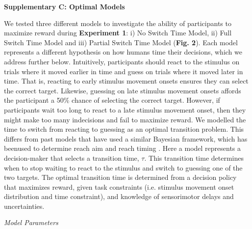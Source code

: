 \documentclass[12pt]{article}
\newcommand\boldblue[1]{\textcolor{mydarkblue}{\textbf{#1}}}
\begin{document}
\newpage
\noindent\boldblue{\large{Supplementary C: Optimal Models}}
\vspace{-1mm}

\noindent We tested three different models to investigate the ability of participants to maximize reward during \boldblue{Experiment 1}: i) No Switch Time Model, ii) Full Switch Time Model and iii) Partial Switch Time Model (\boldblue{Fig. 2}). Each model represents a different hypothesis on how humans time their decisions, which we address further below. Intuitively, participants should react to the stimulus on trials where it moved earlier in time and guess on trials where it moved later in time. That is, reacting to early stimulus movement onsets ensures they can select the correct target. Likewise, guessing on late stimulus movement onsets affords the participant a 50\% chance of selecting the correct target. However, if participants wait too long to react to a late stimulus movement onset, then they might make too many indecisions and fail to maximize reward.
We modelled the time to switch from reacting to guessing as an optimal transition problem. This differs from past models that have used a similar Bayesian framework, which has beenused to determine reach aim \autocite{trommershauserStatisticalDecisionTheory2003} and reach timing \autocite{hudsonOptimalCompensationTemporal2008}. Here a model represents a decision-maker that selects a transition time, $\tau$. This transition time determines when to stop waiting to react to the stimulus and switch to guessing one of the two targets. The optimal transition time is determined from a decision policy that maximizes reward, given task constraints (i.e. stimulus movement onset distribution and time constraint), and knowledge of sensorimotor delays and uncertainties.

\vspace{2mm}
\noindent \emph{Model Parameters}
\end{document}
